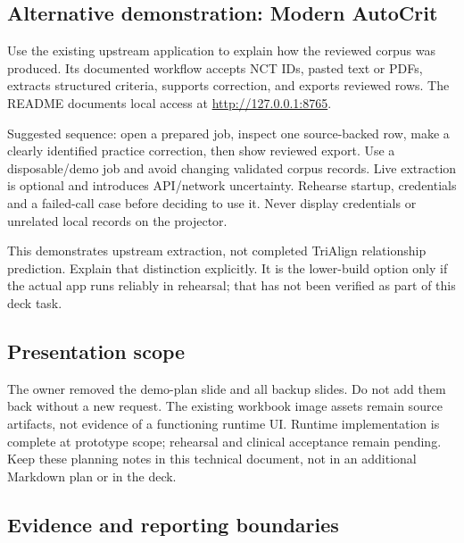\documentclass[10pt,letterpaper]{article}
\begin{document}
\subsection{Alternative demonstration: Modern AutoCrit}\label{demo-alternative-demonstration-modern-autocrit}

Use the existing upstream application to explain how the reviewed corpus was produced. Its documented workflow accepts NCT IDs, pasted text or PDFs, extracts structured criteria, supports correction, and exports reviewed rows. The README documents local access at \url{http://127.0.0.1:8765}.

Suggested sequence: open a prepared job, inspect one source-backed row, make a clearly identified practice correction, then show reviewed export. Use a disposable/demo job and avoid changing validated corpus records. Live extraction is optional and introduces API/network uncertainty. Rehearse startup, credentials and a failed-call case before deciding to use it. Never display credentials or unrelated local records on the projector.

This demonstrates upstream extraction, not completed TriAlign relationship prediction. Explain that distinction explicitly. It is the lower-build option only if the actual app runs reliably in rehearsal; that has not been verified as part of this deck task.

\subsection{Presentation scope}\label{demo-presentation-scope}

The owner removed the demo-plan slide and all backup slides. Do not add them back without a new request. The existing workbook image assets remain source artifacts, not evidence of a functioning runtime UI. Runtime implementation is complete at prototype scope; rehearsal and clinical acceptance remain pending. Keep these planning notes in this technical document, not in an additional Markdown plan or in the deck.

\subsection{Evidence and reporting boundaries}\label{demo-evidence-and-reporting-boundaries}
\end{document}
